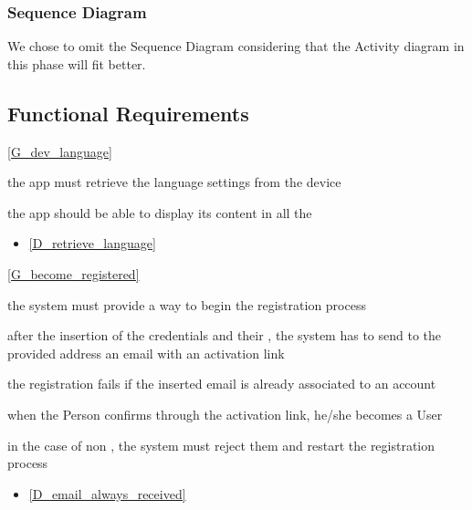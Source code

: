 		


\subsubsection{Sequence Diagram}
We chose to omit the Sequence Diagram considering that the Activity diagram in this phase will fit better.
\subsection{Functional Requirements}
	\ref{G_dev_language} 
	\begin{enumerate}[label={[R\arabic*]}]
		\item the app must retrieve the language settings from the device
		\item the app should be able to display its content in all the 
	\end{enumerate}
	\begin{itemize}
		\item[] \ref{D_retrieve_language}
	\end{itemize}

	\noindent\ref{G_become_registered}
	\begin{enumerate}[resume, label={[R\arabic*]}]
	
		\item \label{R_begin_registration} the system must provide a way to begin the registration process
		\item \label{R_send_email} after the insertion of the credentials and their , the system has to send to the provided address an email with an activation link
		\item \label{R_unique_email} the registration fails if the inserted email is already associated to an account
		\item \label{R_user_after_activation} when the Person confirms through the activation link, he/she becomes a User
		\item \label{R_restart} in the case of non , the system must reject them and restart the registration process
	\end{enumerate}
	\begin{itemize}
		\item[] \ref{D_email_always_received}
	\end{itemize}
	
